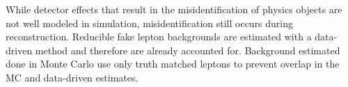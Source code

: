  While detector effects that result in the misidentification of physics objects are not well modeled in simulation, misidentification still occurs during reconstruction.  Reducible fake lepton backgrounds are estimated with a data-driven method and therefore are already accounted for.  Background estimated done in Monte Carlo use only truth matched leptons to prevent overlap in the MC and data-driven estimates. 
 
 


